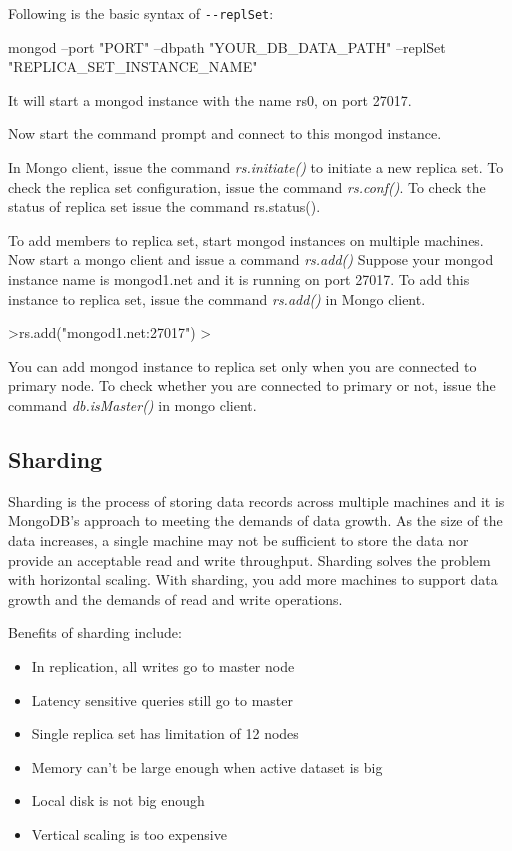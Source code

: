 \documentclass[12pt]{article}
\begin{document}
\begin{bashcode}
\begin{bashcode}
Following is the basic syntax of \verb=--replSet=:

\begin{bashcode}
mongod --port "PORT" --dbpath "YOUR_DB_DATA_PATH" --replSet "REPLICA_SET_INSTANCE_NAME"
\end{bashcode}
It will start a mongod instance with the name rs0, on port 27017.

Now start the command prompt and connect to this mongod instance.

In Mongo client, issue the command \emph{rs.initiate()} to initiate a
new replica set. To check the replica set configuration, issue the
command \emph{rs.conf()}. To check the status of replica set issue the
command rs.status().

To add members to replica set, start mongod instances on multiple
machines. Now start a mongo client and issue a command \emph{rs.add()}
Suppose your mongod instance name is mongod1.net and it is running on
port 27017. To add this instance to replica set, issue the command
\emph{rs.add()} in Mongo client.

\begin{bashcode}
>rs.add("mongod1.net:27017")
>
\end{bashcode}

You can add mongod instance to replica set only when you are connected
to primary node. To check whether you are connected to primary or not,
issue the command \emph{db.isMaster()} in mongo client.

\newpage
\subsection{Sharding}

Sharding is the process of storing data records across multiple machines
and it is MongoDB's approach to meeting the demands of data growth. As
the size of the data increases, a single machine may not be sufficient
to store the data nor provide an acceptable read and write throughput.
Sharding solves the problem with horizontal scaling. With sharding, you
add more machines to support data growth and the demands of read and
write operations.

Benefits of sharding include:
\begin{itemize}
  \item In replication, all writes go to master node
  \item Latency sensitive queries still go to master
  \item Single replica set has limitation of 12 nodes
  \item Memory can't be large enough when active dataset is big
  \item Local disk is not big enough
  \item Vertical scaling is too expensive
\end{itemize}


\end{bashcode}
\end{bashcode}
\end{document}
